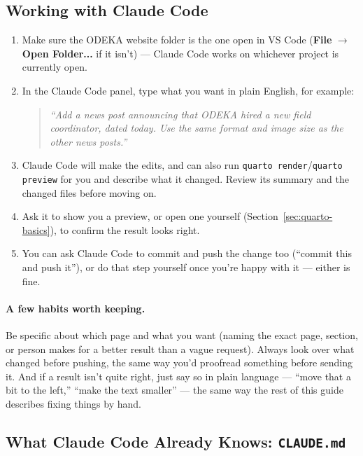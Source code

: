 \documentclass[11pt]{article}
\newcommand{\file}[1]{\texttt{#1}}
\newcommand{\cmd}[1]{\texttt{#1}}
\begin{document}
\subsection{Working with Claude Code}

\begin{enumerate}
    \item Make sure the ODEKA website folder is the one open in VS Code
    (\textbf{File} $\to$ \textbf{Open Folder...} if it isn't) --- Claude
    Code works on whichever project is currently open.
    \item In the Claude Code panel, type what you want in plain English,
    for example:
    \begin{quote}
    \textit{``Add a news post announcing that ODEKA hired a new field
    coordinator, dated today. Use the same format and image size as the
    other news posts.''}
    \end{quote}
    \item Claude Code will make the edits, and can also run
    \cmd{quarto render}/\cmd{quarto preview} for you and describe what it
    changed. Review its summary and the changed files before moving on.
    \item Ask it to show you a preview, or open one yourself
    (Section~\ref{sec:quarto-basics}), to confirm the result looks right.
    \item You can ask Claude Code to commit and push the change too
    (``commit this and push it''), or do that step yourself once you're
    happy with it --- either is fine.
\end{enumerate}

\paragraph{A few habits worth keeping.} Be specific about which page and
what you want (naming the exact page, section, or person makes for a
better result than a vague request). Always look over what changed before
pushing, the same way you'd proofread something before sending it. And if
a result isn't quite right, just say so in plain language --- ``move that
a bit to the left,'' ``make the text smaller'' --- the same way the rest
of this guide describes fixing things by hand.

\subsection{What Claude Code Already Knows: \file{CLAUDE.md}}
\label{sec:claude-md}
\end{document}
